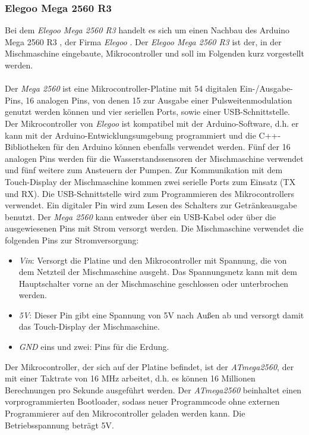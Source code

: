 \subsubsection{Elegoo Mega 2560 R3}
Bei dem \textit{Elegoo Mega 2560 R3} handelt es sich um einen Nachbau des Arduino Mega 2560 R3 \cite{arduino_mega}, der Firma \textit{Elegoo} \cite{elegoo}. Der \textit{Elegoo Mega 2560 R3} ist der, in der Mischmaschine eingebaute, Mikrocontroller und soll im Folgenden kurz vorgestellt werden.\\\\
Der \textit{Mega 2560} ist eine Mikrocontroller-Platine mit 54 digitalen Ein-/Ausgabe-Pins, 16 analogen Pins, von denen 15 zur Ausgabe einer Pulsweitenmodulation genutzt werden können und vier seriellen Ports, sowie einer USB-Schnittstelle. Der Mikrocontroller von \textit{Elegoo} ist kompatibel mit der Arduino-Software, d.h. er kann mit der Arduino-Entwicklungsumgebung programmiert und die C++-Bibliotheken für den Arduino können ebenfalls verwendet werden. Fünf der 16 analogen Pins werden für die Wasserstandssensoren der Mischmaschine verwendet und fünf weitere zum Ansteuern der Pumpen. Zur Kommunikation mit dem Touch-Display der Mischmaschine kommen zwei serielle Ports zum Einsatz (TX und RX). Die USB-Schnittstelle wird zum Programmieren des Mikrocontrollers verwendet. Ein digitaler Pin wird zum Lesen des Schalters zur Getränkeausgabe benutzt. Der \textit{Mega 2560} kann entweder über ein USB-Kabel oder über die ausgewiesenen Pins mit Strom versorgt werden. Die Mischmaschine verwendet die folgenden Pins zur Stromversorgung:
\begin{itemize}
    \item \textit{Vin}: Versorgt die Platine und den Mikrocontroller mit Spannung, die von dem Netzteil der Mischmaschine ausgeht. Das Spannungsnetz kann mit dem Hauptschalter vorne an der Mischmaschine geschlossen oder unterbrochen werden.
    \item \textit{5V}: Dieser Pin gibt eine Spannung von 5V nach Außen ab und versorgt damit das Touch-Display der Mischmaschine.
    \item \textit{GND} eins und zwei: Pins für die Erdung.
\end{itemize} 
Der Mikrocontroller, der sich auf der Platine befindet, ist der \textit{ATmega2560}, der mit einer Taktrate von 16 \ac{MHz} arbeitet, d.h. es können 16 Millionen Berechnungen pro Sekunde ausgeführt werden. Der \textit{ATmega2560} beinhaltet einen vorprogrammierten Bootloader, sodass neuer Programmcode ohne externen Programmierer auf den Mikrocontroller geladen werden kann. Die Betriebsspannung beträgt 5V.
